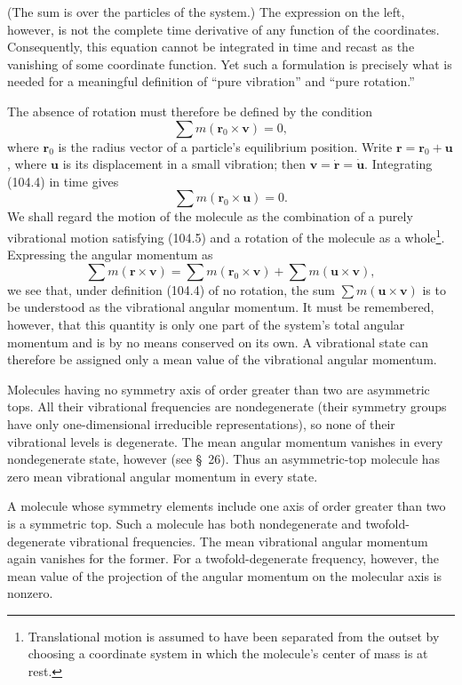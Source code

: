 (The sum is over the particles of the system.) The expression on the left, however, is not the complete time derivative of any function of the coordinates. Consequently, this equation cannot be integrated in time and recast as the vanishing of some coordinate function. Yet such a formulation is precisely what is needed for a meaningful definition of ``pure vibration'' and ``pure rotation.''

The absence of rotation must therefore be defined by the condition
\begin{equation}
 \sum m(\mathbf r_0\times\mathbf v)=0,
 \tag{104.4}
\end{equation}
where $\mathbf r_0$ is the radius vector of a particle's equilibrium position. Write $\mathbf r=\mathbf r_0+\mathbf u$, where $\mathbf u$ is its displacement in a small vibration; then $\mathbf v=\dot{\mathbf r}=\dot{\mathbf u}$. Integrating (104.4) in time gives
\begin{equation}
 \sum m(\mathbf r_0\times\mathbf u)=0.
 \tag{104.5}
\end{equation}
We shall regard the motion of the molecule as the combination of a purely vibrational motion satisfying (104.5) and a rotation of the molecule as a whole\footnote{Translational motion is assumed to have been separated from the outset by choosing a coordinate system in which the molecule's center of mass is at rest.}. Expressing the angular momentum as
\[
 \sum m(\mathbf r\times\mathbf v)=\sum m(\mathbf r_0\times\mathbf v)+\sum m(\mathbf u\times\mathbf v),
\]
we see that, under definition (104.4) of no rotation, the sum $\sum m(\mathbf u\times\mathbf v)$ is to be understood as the vibrational angular momentum. It must be remembered, however, that this quantity is only one part of the system's total angular momentum and is by no means conserved on its own. A vibrational state can therefore be assigned only a mean value of the vibrational angular momentum.

Molecules having no symmetry axis of order greater than two are asymmetric tops. All their vibrational frequencies are nondegenerate (their symmetry groups have only one-dimensional irreducible representations), so none of their vibrational levels is degenerate. The mean angular momentum vanishes in every nondegenerate state, however (see §~26). Thus an asymmetric-top molecule has zero mean vibrational angular momentum in every state.

A molecule whose symmetry elements include one axis of order greater than two is a symmetric top. Such a molecule has both nondegenerate and twofold-degenerate vibrational frequencies. The mean vibrational angular momentum again vanishes for the former. For a twofold-degenerate frequency, however, the mean value of the projection of the angular momentum on the molecular axis is nonzero.

